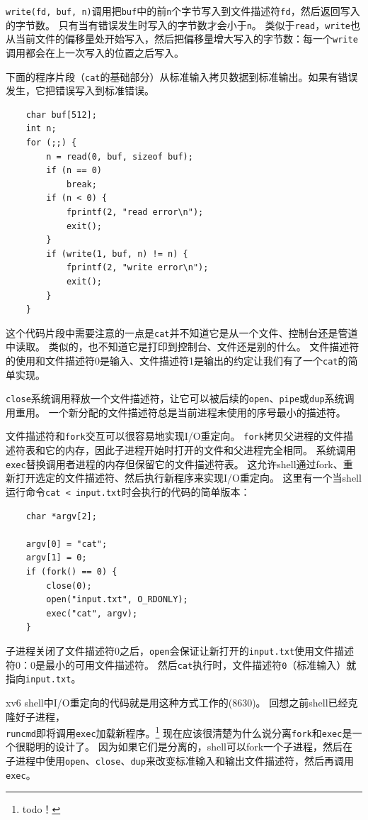 \texttt{write(fd, buf, n)}调用把\texttt{buf}中的前\texttt{n}个字节写入到文件描述符\texttt{fd}，然后返回写入的字节数。
只有当有错误发生时写入的字节数才会小于\texttt{n}。
类似于\texttt{read}，\texttt{write}也从当前文件的偏移量处开始写入，然后把偏移量增大写入的字节数：每一个\texttt{write}调用都会在上一次写入的位置之后写入。

下面的程序片段（\texttt{cat}的基础部分）从标准输入拷贝数据到标准输出。如果有错误发生，它把错误写入到标准错误。
\begin{lstlisting}
    char buf[512];
    int n;
    for (;;) {
        n = read(0, buf, sizeof buf);
        if (n == 0)
            break;
        if (n < 0) {
            fprintf(2, "read error\n");
            exit();
        }
        if (write(1, buf, n) != n) {
            fprintf(2, "write error\n");
            exit();
        }
    }
\end{lstlisting}

这个代码片段中需要注意的一点是\texttt{cat}并不知道它是从一个文件、控制台还是管道中读取。
类似的，也不知道它是打印到控制台、文件还是别的什么。
文件描述符的使用和文件描述符0是输入、文件描述符1是输出的约定让我们有了一个\texttt{cat}的简单实现。

\texttt{close}系统调用释放一个文件描述符，让它可以被后续的\texttt{open}、\texttt{pipe}或\texttt{dup}系统调用重用。
一个新分配的文件描述符总是当前进程未使用的序号最小的描述符。

文件描述符和\texttt{fork}交互可以很容易地实现I/O重定向。
\texttt{fork}拷贝父进程的文件描述符表和它的内存，因此子进程开始时打开的文件和父进程完全相同。
系统调用\texttt{exec}替换调用者进程的内存但保留它的文件描述符表。
这允许shell通过fork、重新打开选定的文件描述符、然后执行新程序来实现I/O重定向。
这里有一个当shell运行命令\texttt{cat < input.txt}时会执行的代码的简单版本：

\begin{lstlisting}
    char *argv[2];

    argv[0] = "cat";
    argv[1] = 0;
    if (fork() == 0) {
        close(0);
        open("input.txt", O_RDONLY);
        exec("cat", argv);
    }
\end{lstlisting}

子进程关闭了文件描述符0之后，\texttt{open}会保证让新打开的\texttt{input.txt}使用文件描述符0：0是最小的可用文件描述符。
然后\texttt{cat}执行时，文件描述符\texttt{0}（标准输入）就指向\texttt{input.txt}。

xv6 shell中I/O重定向的代码就是用这种方式工作的(8630)。
回想之前shell已经克隆好子进程，\\
\texttt{runcmd}即将调用\texttt{exec}加载新程序。\footnote{todo！}
现在应该很清楚为什么说分离\texttt{fork}和\texttt{exec}是一个很聪明的设计了。
因为如果它们是分离的，shell可以fork一个子进程，然后在子进程中使用\texttt{open}、\texttt{close}、\texttt{dup}来改变标准输入和输出文件描述符，然后再调用\texttt{exec}。

